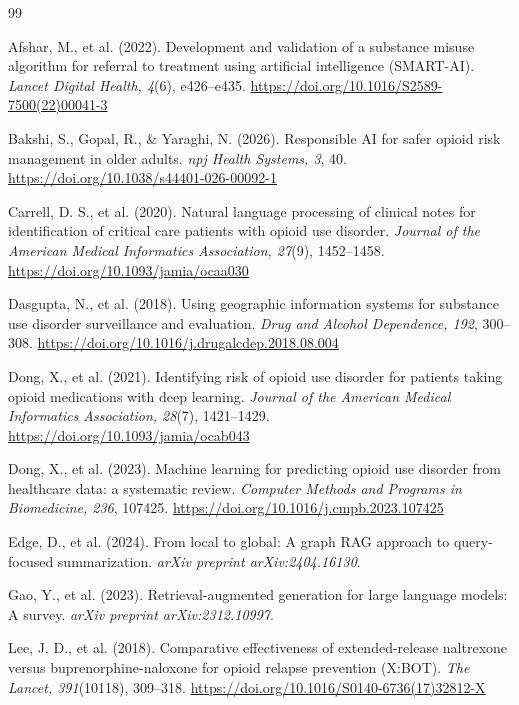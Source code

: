 \documentclass[11pt]{article}
\begin{document}
\newpage
\begin{thebibliography}{99}
\small

 Afshar, M., et al. (2022). Development and validation of a substance misuse algorithm for referral to treatment using artificial intelligence (SMART-AI). \emph{Lancet Digital Health, 4}(6), e426--e435. \url{https://doi.org/10.1016/S2589-7500(22)00041-3}

 Bakshi, S., Gopal, R., \& Yaraghi, N. (2026). Responsible AI for safer opioid risk management in older adults. \emph{npj Health Systems, 3}, 40. \url{https://doi.org/10.1038/s44401-026-00092-1}

 Carrell, D. S., et al. (2020). Natural language processing of clinical notes for identification of critical care patients with opioid use disorder. \emph{Journal of the American Medical Informatics Association, 27}(9), 1452--1458. \url{https://doi.org/10.1093/jamia/ocaa030}

 Dasgupta, N., et al. (2018). Using geographic information systems for substance use disorder surveillance and evaluation. \emph{Drug and Alcohol Dependence, 192}, 300--308. \url{https://doi.org/10.1016/j.drugalcdep.2018.08.004}

 Dong, X., et al. (2021). Identifying risk of opioid use disorder for patients taking opioid medications with deep learning. \emph{Journal of the American Medical Informatics Association, 28}(7), 1421--1429. \url{https://doi.org/10.1093/jamia/ocab043}

 Dong, X., et al. (2023). Machine learning for predicting opioid use disorder from healthcare data: a systematic review. \emph{Computer Methods and Programs in Biomedicine, 236}, 107425. \url{https://doi.org/10.1016/j.cmpb.2023.107425}

 Edge, D., et al. (2024). From local to global: A graph RAG approach to query-focused summarization. \emph{arXiv preprint arXiv:2404.16130}.

 Gao, Y., et al. (2023). Retrieval-augmented generation for large language models: A survey. \emph{arXiv preprint arXiv:2312.10997}.

 Lee, J. D., et al. (2018). Comparative effectiveness of extended-release naltrexone versus buprenorphine-naloxone for opioid relapse prevention (X:BOT). \emph{The Lancet, 391}(10118), 309--318. \url{https://doi.org/10.1016/S0140-6736(17)32812-X}


\end{thebibliography}
\end{document}
